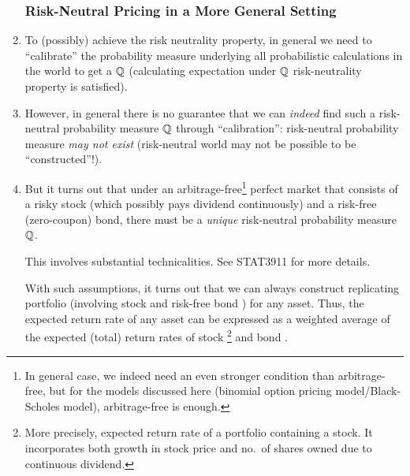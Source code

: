 \begin{enumerate}
\begin{center}
\end{center}

\subsubsection*{Risk-Neutral Pricing in a More General Setting}
\item To (possibly) achieve the risk neutrality property, in general we need to
``calibrate'' the probability measure underlying all probabilistic calculations
in the world to get a  \(\mathbb{Q}\)
(calculating expectation under \(\mathbb{Q}\)  risk-neutrality
property is satisfied).

\item However, in general there is no guarantee that we can \emph{indeed} find
such a risk-neutral probability measure \(\mathbb{Q}\) through ``calibration'':
risk-neutral probability measure \emph{may not exist} (risk-neutral world may
not be possible to be ``constructed''!).

\item \label{it:unique-rn-prob-measure}
But it turns out that under an arbitrage-free\footnote{In general case, we
indeed need an even stronger condition than arbitrage-free, but for the models
discussed here (binomial option pricing model/Black-Scholes model),
arbitrage-free is enough.} perfect market that consists of a risky stock (which
possibly pays dividend continuously) and a risk-free (zero-coupon) bond, there
must be a \emph{unique} risk-neutral probability measure \(\mathbb{Q}\).
\begin{note}
This involves substantial technicalities. See STAT3911 for more details.
\end{note}

\begin{intuition}
With such assumptions, it turns out that we can always construct replicating
portfolio (involving stock  and risk-free bond
) for any asset. Thus, the expected return rate of
any asset can be expressed as a weighted average of the expected (total) return
rates of stock \footnote{More precisely, expected return rate
of a portfolio containing a stock. It incorporates both growth in stock price
and no.\ of shares owned due to continuous dividend.}  and bond
.


\end{intuition}
\end{enumerate}
